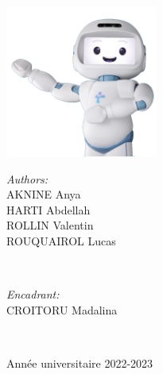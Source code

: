 \begin{titlepage}
\includegraphics[width=5cm]{Figures/qt.png}\\[2cm]

 


\begin{minipage}{0.4\textwidth}
\begin{flushleft} %
\emph{Authors:} \\[0.2em]  %
AKNINE Anya \\[0.2em]
HARTI Abdellah \\[0.2em]
ROLLIN Valentin \\[0.2em]
ROUQUAIROL Lucas \\[0.2em]

\end{flushleft}
\end{minipage}
~
\begin{minipage}{0.4\textwidth}
\begin{flushright} %
\emph{Encadrant:}\\
CROITORU Madalina\\[0.2em] %
\end{flushright}
\end{minipage}\\[1.81cm]
\makeatother


Année universitaire 2022-2023
\vfill %

\end{titlepage}